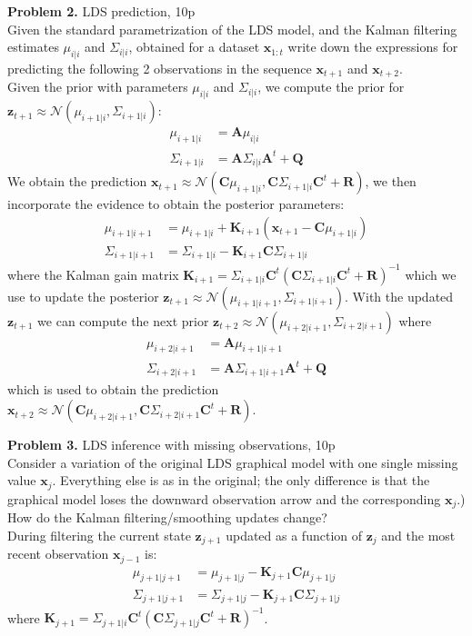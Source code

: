 \documentclass[12pt]{article}
\newcommand{\matr}[1]{\bm{#1}}     %
\newcommand{\vect}[1]{\mathbf{#1}}
\begin{document}
\noindent \textbf{Problem 2. } LDS prediction, 10p \\%
Given the standard parametrization of the LDS model, and the Kalman filtering estimates $\mu_{i|i}$ and $\Sigma_{i|i}$, obtained for a dataset $\vect{x}_{1:t}$ write down the expressions 
for predicting the following 2 observations in the sequence $\vect{x}_{t+1}$ and  $\vect{x}_{t+2}$.\\
Given the prior with parameters  $\mu_{i|i}$ and $\Sigma_{i|i}$, we compute the prior for $\vect{z}_{t + 1} \approx \mathcal{N} (\mu_{i+1|i}, \Sigma_{i+1|i})$:
\begin{align*}
	\mu_{i+1|i}	&= 	\matr{A} \mu_{i|i} \\
	\Sigma_{i+1|i}	&=	 \matr{A}  \Sigma_{i|i}  \matr{A}^t + \matr{Q}
\end{align*}
We obtain the prediction $\vect{x}_{t+1} \approx \mathcal{N} (\matr{C} \mu_{i+1|i}, \matr{C} \Sigma_{i+1|i} \matr{C}^t + \matr{R} )$, we then incorporate the evidence to obtain the posterior parameters:
\begin{align*}
	\mu_{i+1|i+1}		&= 	\mu_{i+1|i} + \matr{K}_{i+1} (\vect{x}_{t+1} - \matr{C} \mu_{i+1|i}) \\
	\Sigma_{i+1|i+1}	&=	\Sigma_{i+1|i} - \matr{K}_{i+1} 	 \matr{C}  \Sigma_{i+1|i}
\end{align*}
where the Kalman gain matrix $ \matr{K}_{i+1} = \Sigma_{i+1|i}	 \matr{C} ^t ( \matr{C} \Sigma_{i+1|i}  \matr{C} ^t + \matr{R})^{-1}$
which we use to update the posterior $\vect{z}_{t+1} \approx \mathcal{N} (\mu_{i+1|i+1},\Sigma_{i+1|i+1})$.
With the updated  $\vect{z}_{t+1}$ we can compute the next prior $\vect{z}_{t + 2} \approx \mathcal{N} (\mu_{i+2|i+1}, \Sigma_{i+2|i+1})$ where 
\begin{align*}
	\mu_{i+2|i+1}		&= 	\matr{A} \mu_{i+1|i+1} \\
	\Sigma_{i+2|i+1}	&=	 \matr{A}  \Sigma_{i+1|i+1}  \matr{A}^t + \matr{Q}
\end{align*}
which is used to obtain the prediction  $\vect{x}_{t+2} \approx \mathcal{N} (\matr{C} \mu_{i+2|i+1}, \matr{C} \Sigma_{i+2|i+1} \matr{C}^t + \matr{R} )$.
 
\noindent \textbf{Problem 3.} LDS inference with missing observations, 10p \\%
Consider a variation of the original LDS graphical model with one single missing value $\mathbf{x}_j$. Everything else is as in the original; the only difference is that the graphical model loses the downward observation arrow and the corresponding $\mathbf{x}_j$.)
How do the Kalman filtering/smoothing updates change?\\
During filtering the current state  $\vect{z}_{j+1}$ updated as a function of  $\vect{z}_{j}$ and the most recent observation $\vect{x}_{j-1}$ is:
\begin{align*}
	\mu_{j+1|j+1}	&= 	\mu_{j+1|j} - \matr{K}_{j+1}  \matr{C} \mu_{j+1|j} \\
	\Sigma_{j+1|j+1}	&=	\Sigma_{j+1|j} - \matr{K}_{j+1} 	 \matr{C}  \Sigma_{j+1|j}
\end{align*}
where $ \matr{K}_{j+1} = \Sigma_{j+1|i}	 \matr{C} ^t ( \matr{C} \Sigma_{j+1|j}  \matr{C} ^t + \matr{R})^{-1}$.
\end{document}
